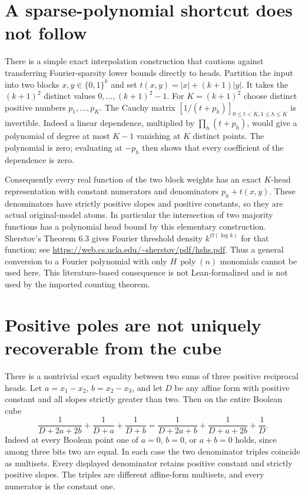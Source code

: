 \documentclass[11pt]{article}
\begin{document}
\section{A sparse-polynomial shortcut does not follow}
There is a simple exact interpolation construction that cautions against
transferring Fourier-sparsity lower bounds directly to heads.
Partition the input into two blocks $x,y\in\{0,1\}^k$ and set
$t(x,y)=|x|+(k+1)|y|$. It takes the $(k+1)^2$ distinct values
$0,\ldots,(k+1)^2-1$.
For $K=(k+1)^2$ choose distinct positive numbers $p_1,\ldots,p_K$.
The Cauchy matrix $[1/(t+p_h)]_{0\leq t<K,1\leq h\leq K}$ is invertible.
Indeed a linear dependence, multiplied by $\prod_h(t+p_h)$,
would give a polynomial of degree at most $K-1$ vanishing at $K$
distinct points. The polynomial is zero; evaluating at $-p_h$ then
shows that every coefficient of the dependence is zero.

Consequently every real function of the two block weights has an exact
$K$-head representation with constant numerators and denominators
$p_h+t(x,y)$. These denominators have strictly positive slopes and
positive constants, so they are actual original-model atoms.
In particular the intersection of two majority functions has a
polynomial head bound by this elementary construction. Sherstov's
Theorem 6.3 gives Fourier threshold density
$k^{\Omega(\log k)}$ for that function; see
\url{https://web.cs.ucla.edu/~sherstov/pdf/hshs.pdf}.
Thus a general conversion to a Fourier polynomial with only
$H\,\operatorname{poly}(n)$ monomials cannot be used here.
This literature-based consequence is not Lean-formalized and is not
used by the imported counting theorem.

\section{Positive poles are not uniquely recoverable from the cube}
There is a nontrivial exact equality between two sums of three positive
reciprocal heads. Let $a=x_1-x_2$, $b=x_2-x_3$, and let $D$ be any
affine form with positive constant and all slopes strictly greater than
two. Then on the entire Boolean cube
\[
 \frac1{D+2a+2b}+\frac1{D+a}+\frac1{D+b}
 =\frac1{D+2a+b}+\frac1{D+a+2b}+\frac1D.
\]
Indeed at every Boolean point one of $a=0$, $b=0$, or $a+b=0$ holds,
since among three bits two are equal. In each case the two denominator
triples coincide as multisets. Every displayed denominator retains
positive constant and strictly positive slopes. The triples are
different affine-form multisets, and every numerator is the constant one.
\end{document}
